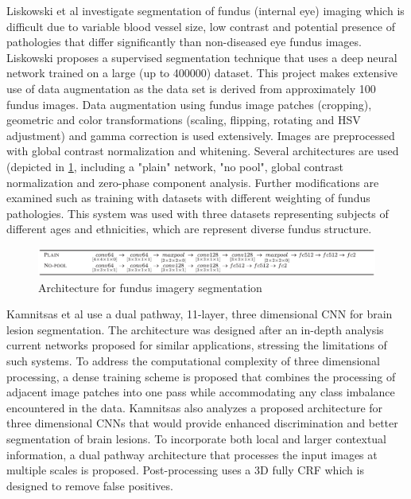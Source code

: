 \documentclass[letterpaper, 10 pt, conference]{ieeeconf}  %
\begin{document}
Liskowski et al investigate  \cite{liskowski_segmenting_2016} segmentation of fundus (internal eye) imaging which is difficult due to variable blood vessel size, low contrast and potential presence of pathologies that differ significantly than non-diseased eye fundus images. Liskowski proposes a supervised segmentation technique that uses a deep neural network trained on a large (up to 400000) dataset. This project makes extensive use of data augmentation as the data set is derived from approximately 100 fundus images. Data augmentation using fundus image patches (cropping), geometric and color transformations (scaling, flipping, rotating and HSV adjustment) and gamma correction is used extensively. Images are preprocessed with global contrast normalization and whitening. Several architectures are used (depicted in \ref{fig:liskowski}, including a "plain" network, "no pool",  global contrast normalization and zero-phase component analysis. Further modifications are examined such as training with datasets with different weighting of fundus pathologies. This system was used with three datasets representing subjects of different ages and ethnicities, which are represent diverse fundus structure. 

\begin{figure}
  \includegraphics[width=\linewidth]{images/liskowski.png}
  \caption{Architecture for fundus imagery segmentation \cite{liskowski_segmenting_2016}}
  \label{fig:liskowski}
\end{figure}

Kamnitsas et al \cite{kamnitsas_efficient_2017} use a dual pathway, 11-layer, three dimensional CNN for brain lesion segmentation. The architecture was designed after an in-depth analysis current networks proposed for similar applications, stressing the limitations of such systems. To address the computational complexity of three dimensional processing, a dense training scheme is proposed that combines the processing of adjacent image patches into one pass while accommodating any class imbalance encountered in the data. Kamnitsas also analyzes a proposed architecture for three dimensional CNNs that would provide enhanced discrimination and better segmentation of brain lesions. To incorporate both local and larger contextual information, a dual pathway architecture that processes the input images at multiple scales is proposed. Post-processing uses a 3D fully CRF which is designed to remove false positives. 
\end{document}
